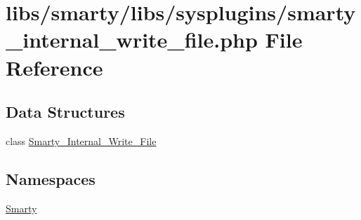 \hypertarget{smarty__internal__write__file_8php}{}\section{libs/smarty/libs/sysplugins/smarty\+\_\+internal\+\_\+write\+\_\+file.php File Reference}
\label{smarty__internal__write__file_8php}
\subsection*{Data Structures}
\begin{DoxyCompactItemize}
\item 
class \hyperlink{class_smarty___internal___write___file}{Smarty\+\_\+\+Internal\+\_\+\+Write\+\_\+\+File}
\end{DoxyCompactItemize}
\subsection*{Namespaces}
\begin{DoxyCompactItemize}
\item 
 \hyperlink{namespace_smarty}{Smarty}
\end{DoxyCompactItemize}
